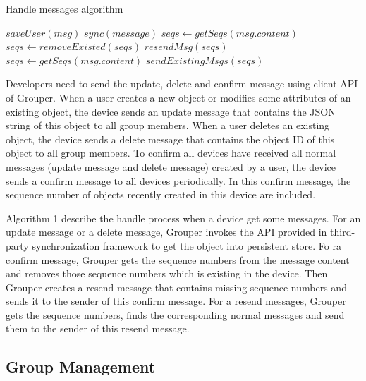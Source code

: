\documentclass[twocolumn,10pt]{article}
\begin{document}
\begin{algorithm}[t]
	\caption{Handle messages algorithm}\label{alg:euclid}
	\begin{algorithmic}[1]		
		\State $saveUser(msg)$
		\EndIf
		\State $sync(message)$
		\State $seqs \gets getSeqs(msg.content)$
		\State $seqs \gets removeExisted(seqs)$
		\State $resendMsg(seqs)$
		\State $seqs \gets getSeqs(msg.content)$
		\State $sendExistingMsgs(seqs)$
		\EndIf
		\EndIf
		\EndFor
		\EndProcedure
	\end{algorithmic}
\end{algorithm}

Developers need to send the update, delete and confirm message using client API of Grouper.
When a user creates a new object or modifies some attributes of an existing object, the device sends an update message that contains the JSON string of this object to all group members.
When a user deletes an existing object, the device sends a delete message that contains the object ID of this object to all group members.
To confirm all devices have received all normal messages (update message and delete message) created by a user, the device sends a confirm message to all devices periodically.
In this confirm message, the sequence number of objects recently created in this device are included.

Algorithm 1 describe the handle process when a device get some messages.
For an update message or a delete message, Grouper invokes the API provided in third-party synchronization framework to get the object into persistent store.
Fo ra confirm message, Grouper gets the sequence numbers from the message content and removes those sequence numbers which is existing in the device.
Then Grouper creates a resend message that contains missing sequence numbers and sends it to the sender of this confirm message.
For a resend messages, Grouper gets the sequence numbers, finds the corresponding normal messages and send them to the sender of this resend message.

\subsection{Group Management}
\end{document}
